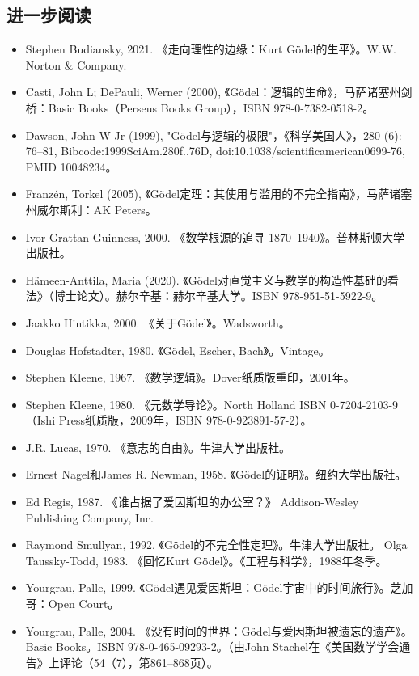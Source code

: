 \subsection{进一步阅读}  
\begin{itemize}
\item Stephen Budiansky, 2021. 《走向理性的边缘：Kurt Gödel的生平》。W.W. Norton & Company.  
\item Casti, John L; DePauli, Werner (2000), 《Gödel：逻辑的生命》，马萨诸塞州剑桥：Basic Books（Perseus Books Group），ISBN 978-0-7382-0518-2。  
\item Dawson, John W Jr (1999), "Gödel与逻辑的极限"，《科学美国人》，280 (6): 76–81, Bibcode:1999SciAm.280f..76D, doi:10.1038/scientificamerican0699-76, PMID 10048234。  
\item Franzén, Torkel (2005), 《Gödel定理：其使用与滥用的不完全指南》，马萨诸塞州威尔斯利：AK Peters。  
\item Ivor Grattan-Guinness, 2000. 《数学根源的追寻 1870–1940》。普林斯顿大学出版社。  
\item Hämeen-Anttila, Maria (2020). 《Gödel对直觉主义与数学的构造性基础的看法》（博士论文）。赫尔辛基：赫尔辛基大学。ISBN 978-951-51-5922-9。  
\item Jaakko Hintikka, 2000. 《关于Gödel》。Wadsworth。  
\item Douglas Hofstadter, 1980. 《Gödel, Escher, Bach》。Vintage。  
\item Stephen Kleene, 1967. 《数学逻辑》。Dover纸质版重印，2001年。  
\item Stephen Kleene, 1980. 《元数学导论》。North Holland ISBN 0-7204-2103-9（Ishi Press纸质版，2009年，ISBN 978-0-923891-57-2）。  
\item J.R. Lucas, 1970. 《意志的自由》。牛津大学出版社。  
\item Ernest Nagel和James R. Newman, 1958. 《Gödel的证明》。纽约大学出版社。  
\item Ed Regis, 1987. 《谁占据了爱因斯坦的办公室？》 Addison-Wesley Publishing Company, Inc.  
\item Raymond Smullyan, 1992. 《Gödel的不完全性定理》。牛津大学出版社。  
Olga Taussky-Todd, 1983. 《回忆Kurt Gödel》。《工程与科学》，1988年冬季。  
\item Yourgrau, Palle, 1999. 《Gödel遇见爱因斯坦：Gödel宇宙中的时间旅行》。芝加哥：Open Court。  
\item Yourgrau, Palle, 2004. 《没有时间的世界：Gödel与爱因斯坦被遗忘的遗产》。Basic Books。ISBN 978-0-465-09293-2。（由John Stachel在《美国数学学会通告》上评论（54（7），第861–868页）。
\end{itemize}